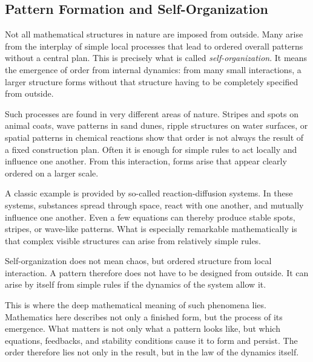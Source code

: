 \newpage
\noindent


\subsection{Pattern Formation and Self-Organization}

Not all mathematical structures in nature are imposed from outside.
Many arise from the interplay of simple local processes
that lead to ordered overall patterns without a central plan.
This is precisely what is called \emph{self-organization}.
It means the emergence of order from internal dynamics:
from many small interactions, a larger structure forms
without that structure having to be completely specified from outside.

Such processes are found in very different areas of nature.
Stripes and spots on animal coats,
wave patterns in sand dunes,
ripple structures on water surfaces,
or spatial patterns in chemical reactions show
that order is not always the result of a fixed construction plan.
Often it is enough
for simple rules to act locally
and influence one another.
From this interaction, forms arise
that appear clearly ordered on a larger scale.

A classic example is provided by so-called reaction-diffusion systems.
In these systems, substances spread through space,
react with one another,
and mutually influence one another.
Even a few equations can thereby produce stable spots,
stripes,
or wave-like patterns.
What is especially remarkable mathematically
is that complex visible structures can arise
from relatively simple rules.

\begin{DidacticBox}
	\label{box:selforganization}
	Self-organization does not mean chaos,
	but ordered structure from local interaction.
	A pattern therefore does not have to be designed from outside.
	It can arise by itself from simple rules
	if the dynamics of the system allow it.
\end{DidacticBox}

This is where the deep mathematical meaning of such phenomena lies.
Mathematics here describes not only a finished form,
but the process of its emergence.
What matters is not only
what a pattern looks like,
but which equations,
feedbacks,
and stability conditions cause it
to form and persist.
The order therefore lies not only in the result,
but in the law of the dynamics itself.

